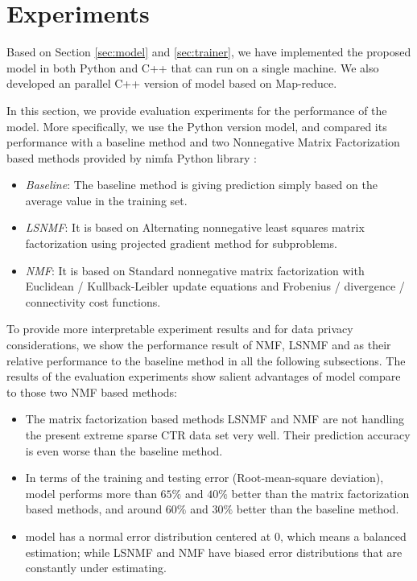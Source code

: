 \section{Experiments}
\label{sec:exp}

Based on Section \ref{sec:model} and \ref{sec:trainer}, we have
implemented the proposed {\sppan} model in both Python and C++ that can
run on a single machine. We also developed an parallel C++ version of
{\sppan} model based on Map-reduce.

In this section, we provide evaluation experiments for the performance
of the {\sppan} model. More specifically, we use the Python version
{\sppan} model, and compared its performance with a baseline method
and two Nonnegative Matrix Factorization based methods provided by
nimfa Python library \cite{ZitnikZ12}:

\begin{itemize} \itemsep -2pt
\item {\em Baseline}: The baseline method is giving prediction simply
  based on the average value in the training set.
\item {\em LSNMF}: It is based on Alternating nonnegative least
  squares matrix factorization using projected gradient method for
  subproblems\cite{lin2007projected}.
\item {\em NMF}: It is based on Standard nonnegative matrix
  factorization with Euclidean / Kullback-Leibler update equations and
  Frobenius / divergence / connectivity cost
  functions\cite{lee2001algorithms, brunet2004metagenes}.
\end{itemize}

To provide more interpretable experiment results and for data privacy
considerations, we show the performance result of NMF, LSNMF and
{\sppan} as their relative performance to the baseline method in all
the following subsections. The results of the evaluation experiments
show salient advantages of {\sppan} model compare to those two NMF
based methods:

\begin{itemize} \itemsep -2pt
\item {} The matrix factorization based methods LSNMF and NMF are not
  handling the present extreme sparse CTR data set very well. Their
  prediction accuracy is even worse than the baseline method.
\item {} In terms of the training and testing error (Root-mean-square
  deviation), {\sppan} model performs more than $65\%$ and $40\%$ better
  than the matrix factorization based methods, and around $60\%$ and
  $30\%$ better than the baseline method.
\item {} {\sppan} model has a normal error distribution centered at 0,
  which means a balanced estimation; while LSNMF and NMF have biased
  error distributions that are constantly under estimating.
\end{itemize}

